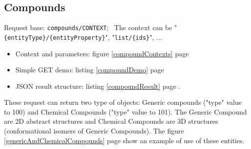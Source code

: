 \subsection{Compounds}
\hspace*{\parindent}
Request base: \texttt{compounds/CONTEXT};~
The context can be "\texttt{\{entityType\}/\{entityProperty\}}", "\texttt{list/\{ids\}}", ... 
\begin{itemize}
	\item Context and parameters: \cf figure \ref{compoundContexts} page \pageref{compoundContexts}
	\item Simple GET demo: \cf listing \ref{compoundDemo} page \pageref{compoundDemo}
	\item JSON result structure: \cf listing \ref{compoundResult} page \pageref{compoundResult}. 
\end{itemize}
\hspace*{\parindent}
These request can return two type of objects: Generic compounds ("type" value to 100) and Chemical Compounds ("type" value to 101). 
The Generic Compound are 2D abstract structures and Chemical Compounds are 3D structures (conformational isomers of Generic Compounds). 
The figure \ref{genericAndChemicalCompounds} page \pageref{genericAndChemicalCompounds} show an example of use of these entities.
